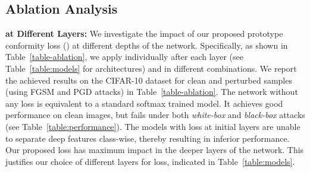 \documentclass[10pt,twocolumn,letterpaper]{article}
\begin{document}
\begin{table}[h]
\caption{ \small{Transferability Test on CIFAR-10: PGD adversaries are generated with , using the source network, and then evaluated on target model. Underline denotes robustness against \textit{white-box} attack. Note that adversarial samples generated on our model are highly transferable to other models as \textit{black-box} attacked images.}} \vspace{-1.5em}
\label{table-transferability}
\begin{center}
\vspace{-1.5em}
\end{center}
\end{table}










\subsection{Ablation Analysis}
\label{subsec:ablation}
\vspace{-0.25em}
\noindent \textbf{ at Different Layers:} We investigate the impact of our proposed prototype conformity loss () at different depths of the network. Specifically, as shown in Table~\ref{table-ablation}, we apply  individually after each layer (see Table~\ref{table:models} for architectures) and in different combinations. We report the achieved results on the CIFAR-10 dataset for clean and perturbed samples (using FGSM and PGD attacks) in Table~\ref{table-ablation}. The network without any  loss is equivalent to a standard softmax trained model. It achieves good performance on clean images, but fails under both \textit{white-box} and \textit{black-box} attacks (see Table~\ref{table:performance}). The models with  loss at initial layers are unable to separate deep features class-wise, thereby resulting in inferior performance. Our proposed  loss has maximum impact in the deeper layers of the network. This justifies our choice of different layers for  loss, indicated in  Table~\ref{table:models}.
\end{document}
